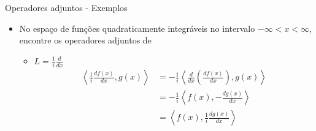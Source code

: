       \begin{slide}[toc=]{Operadores adjuntos - Exemplos}
	      \begin{itemize}
		      \item No espaço de funções quadraticamente integráveis no intervalo $-\infty < x <\infty$, encontre os operadores adjuntos de 
			      \begin{itemize}
				      \item $L = \frac{1}{i}\frac{d}{dx}$
					      \begin{align*}
						      \left < \frac{1}{i}\frac{df(x)}{dx},g(x)\right > &= -\frac{1}{i}\left < \frac{d}{dx}\left (\frac{df(x)}{dx}\right ),g(x)\right >\\
						                                                &= -\frac{1}{i}\left < f(x),-\frac{dg(x)}{dx}\right >\\
												&= \left < f(x),\frac{1}{i}\frac{dg(x)}{dx}\right >
					      \end{align*}
			      \end{itemize}
	      \end{itemize}
      \end{slide}

